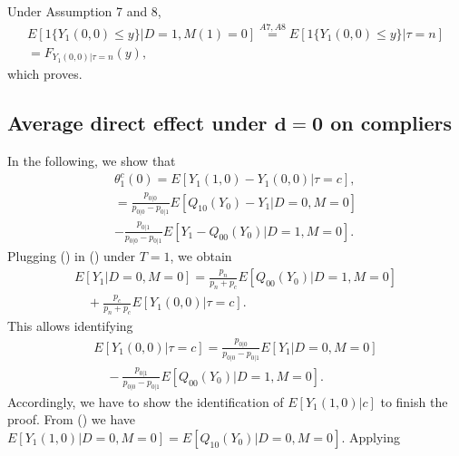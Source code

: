 \documentclass[a4paper,12pt]{article}
\begin{document}
 \doublespacing \pagestyle{plain}
Under Assumption 7 and 8,
\begin{equation}  \begin{array}{rl} E[1\{Y_1(0,0) \leq y\}|D=1,M(1)=0]\stackrel{A7,A8}{=}E[1\{Y_1(0,0) \leq y\}|\tau=n]\\  = F_{Y_{1}(0,0)|\tau=n}(y),
\end{array} \end{equation}
which proves.
\subsection{Average direct effect under $\mathbf{d = 0}$ on compliers}
In the following, we show that
\begin{align*}
\displaystyle \theta_1^{c}(0) = E[Y_1(1,0)-Y_1(0,0)|\tau=c], \\ =
\frac{p_{0|0}}{p_{0|0} - p_{0|1}}E[Q_{10}(Y_0)- Y_1|D=0,M=0] \\
  - \frac{p_{0|1}}{p_{0|0} - p_{0|1}}E[Y_1 - Q_{00}(Y_0)|D=1,M=0].
\end{align*}
Plugging () in () under $T=1$, we obtain
\begin{equation*}
\begin{array}{rl}
E[Y_1|D=0,M=0]  = \displaystyle  \frac{p_n}{p_n + p_c}E[Q_{00}(Y_0)|D=1,M=0] \\
\displaystyle \quad +   \frac{p_c}{p_n + p_c}E[Y_1(0,0)|\tau=c].
\end{array}
\end{equation*}
This allows identifying
\begin{equation} 
\begin{array}{rl}
E[Y_1(0,0)|\tau=c] = \displaystyle \frac{p_{0|0}}{ p_{0|0} - p_{0|1}} E[Y_1|D=0,M=0] \\
 \displaystyle \quad -\frac{p_{0|1}}{p_{0|0} - p_{0|1}}E[Q_{00}(Y_0)|D=1,M=0].
\end{array}
\end{equation}
Accordingly, we have to show the identification of $E[Y_1(1,0)|c]$ to finish the proof. From () we have $E[Y_1(1,0)|D=0,M=0] = E[Q_{10}(Y_0)|D=0,M=0]$. Applying
\end{document}
